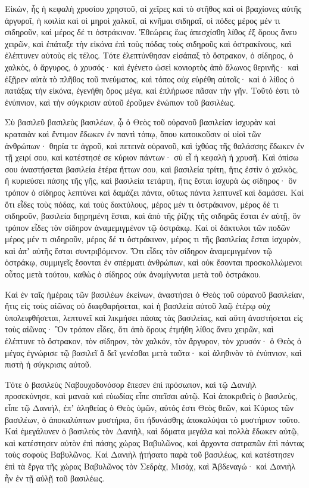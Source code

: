 {Εἰκὼν, ἧς ἡ κεφαλὴ χρυσίου χρηστοῦ, αἱ χεῖρες καὶ τὸ στῆθος καὶ οἱ βραχίονες αὐτῆς ἀργυροῖ, ἡ κοιλία καὶ οἱ μηροὶ χαλκοῖ,
αἱ κνῆμαι σιδηραῖ, οἱ πόδες μέρος μέν τι σιδηροῦν, καὶ μέρος δέ τι ὀστράκινον.
Ἐθεώρεις ἕως ἀπεσχίσθη λίθος ἐξ ὄρους ἄνευ χειρῶν, καὶ ἐπάταξε τὴν εἰκόνα ἐπὶ τοὺς πόδας τοὺς σιδηροῦς καὶ ὀστρακίνους, καὶ ἐλέπτυνεν αὐτοὺς εἰς τέλος.
Τότε ἐλεπτύνθησαν εἰσάπαξ τὸ ὄστρακον, ὁ σίδηρος, ὁ χαλκὸς, ὁ ἄργυρος, ὁ χρυσός· καὶ ἐγένετο ὡσεὶ κονιορτὸς ἀπὸ ἅλωνος θερινῆς· καὶ ἐξῇρεν αὐτὰ τὸ πλῆθος τοῦ πνεύματος, καὶ τόπος οὐχ εὑρέθη αὐτοῖς· καὶ ὁ λίθος ὁ πατάξας τὴν εἰκόνα, ἐγενήθη ὄρος μέγα, καὶ ἐπλήρωσε πᾶσαν τὴν γῆν.
Τοῦτό ἐστι τὸ ἐνύπνιον, καὶ τὴν σύγκρισιν αὐτοῦ ἐροῦμεν ἐνώπιον τοῦ βασιλέως.
\par }{\PP {}Σὺ βασιλεῦ βασιλεὺς βασιλέων, ᾧ ὁ Θεὸς τοῦ οὐρανοῦ βασιλείαν ἰσχυρὰν καὶ κραταιὰν καὶ ἔντιμον ἔδωκεν
ἐν παντὶ τόπῳ, ὅπου κατοικοῦσιν οἱ υἱοὶ τῶν ἀνθρώπων· θηρία τε ἀγροῦ, καὶ πετεινὰ οὐρανοῦ, καὶ ἰχθύας τῆς θαλάσσης ἔδωκεν ἐν τῇ χειρί σου, καὶ κατέστησέ σε κύριον πάντων· σὺ εἶ ἡ κεφαλὴ ἡ χρυσῆ.
Καὶ ὀπίσω σου ἀναστήσεται βασιλεία ἑτέρα ἥττων σου, καὶ βασιλεία τρίτη, ἥτις ἐστὶν ὁ χαλκὸς, ἣ κυριεύσει πάσης τῆς γῆς,
καὶ βασιλεία τετάρτη, ἥτις ἔσται ἰσχυρὰ ὡς σίδηρος· ὃν τρόπον ὁ σίδηρος λεπτύνει καὶ δαμάζει πάντα, οὕτως πάντα λεπτυνεῖ καὶ δαμάσει.
Καὶ ὅτι εἶδες τοὺς πόδας, καὶ τοὺς δακτύλους, μέρος μέν τι ὀστράκινον, μέρος δέ τι σιδηροῦν, βασιλεία διῃρημένη ἔσται, καὶ ἀπὸ τῆς ῥίζης τῆς σιδηρᾶς ἔσται ἐν αὐτῇ, ὃν τρόπον εἶδες τὸν σίδηρον ἀναμεμιγμένον τῷ ὀστράκῳ.
Καὶ οἱ δάκτυλοι τῶν ποδῶν μέρος μέν τι σιδηροῦν, μέρος δέ τι ὀστράκινον, μέρος τι τῆς βασιλείας ἔσται ἰσχυρὸν, καὶ ἀπʼ αὐτῆς ἔσται συντριβόμενον.
Ὅτι εἶδες τὸν σίδηρον ἀναμεμιγμένον τῷ ὀστράκῳ, συμμιγεῖς ἔσονται ἐν σπέρματι ἀνθρώπων, καὶ οὐκ ἔσονται προσκολλώμενοι οὗτος μετὰ τούτου, καθὼς ὁ σίδηρος οὐκ ἀναμίγνυται μετὰ τοῦ ὀστράκου.
\par }{\PP {}Καὶ ἐν ταῖς ἡμέραις τῶν βασιλέων ἐκείνων, ἀναστήσει ὁ Θεὸς τοῦ οὐρανοῦ βασιλείαν, ἥτις εἰς τοὺς αἰῶνας οὐ διαφθαρήσεται, καὶ ἡ βασιλεία αὐτοῦ λαῷ ἑτέρῳ οὐχ ὑπολειφθήσεται, λεπτυνεῖ καὶ λικμήσει πάσας τὰς βασιλείας, καὶ αὕτη ἀναστήσεται εἰς τοὺς αἰῶνας·
Ὃν τρόπον εἶδες, ὅτι ἀπὸ ὄρους ἐτμήθη λίθος ἄνευ χειρῶν, καὶ ἐλέπτυνε τὸ ὄστρακον, τὸν σίδηρον, τὸν χαλκόν, τὸν ἄργυρον, τὸν χρυσόν· ὁ Θεὸς ὁ μέγας ἐγνώρισε τῷ βασιλεῖ ἃ δεῖ γενέσθαι μετὰ ταῦτα· καὶ ἀληθινὸν τὸ ἐνύπνιον, καὶ πιστὴ ἡ σύγκρισις αὐτοῦ.
\par }{\PP {}Τότε ὁ βασιλεὺς Ναβουχοδονόσορ ἔπεσεν ἐπὶ πρόσωπον, καὶ τῷ Δανιὴλ προσεκύνησε, καὶ μαναὰ καὶ εὐωδίας εἶπε σπεῖσαι αὐτῷ.
Καὶ ἀποκριθεὶς ὁ βασιλεὺς, εἶπε τῷ Δανιήλ, ἐπʼ ἀληθείας ὁ Θεὸς ὑμῶν, αὐτός ἐστι Θεὸς θεῶν, καὶ Κύριος τῶν βασιλέων, ὁ ἀποκαλύπτων μυστήρια, ὅτι ἠδυνάσθης ἀποκαλύψαι τὸ μυστήριον τοῦτο.
Καὶ ἐμεγάλυνεν ὁ βασιλεὺς τὸν Δανιὴλ, καὶ δόματα μεγάλα καὶ πολλὰ ἔδωκεν αὐτῷ, καὶ κατέστησεν αὐτὸν ἐπὶ πάσης χώρας Βαβυλῶνος, καὶ ἄρχοντα σατραπῶν ἐπὶ πάντας τοὺς σοφοὺς Βαβυλῶνος.
Καὶ Δανιὴλ ᾐτήσατο παρὰ τοῦ βασιλέως, καὶ κατέστησεν ἐπὶ τὰ ἔργα τῆς χώρας Βαβυλῶνος τὸν Σεδρὰχ, Μισὰχ, καὶ Ἀβδεναγώ· καὶ Δανιὴλ ἦν ἐν τῇ αὐλῇ τοῦ βασιλέως.

}
